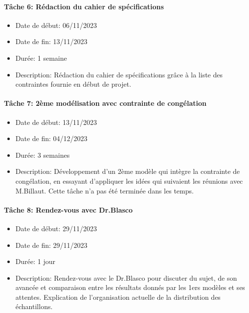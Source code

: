 \documentclass{polytech/polytech}
\numberwithin{figure}{chapter}
\begin{document}
\begin{appendix}
\paragraph{Tâche 6: Rédaction du cahier de spécifications}

\begin{itemize}
    \item Date de début: 06/11/2023
    \item Date de fin: 13/11/2023
    \item Durée: 1 semaine
    \item
        Description: Rédaction du cahier de spécifications grâce à la liste des contraintes fournie en début de projet.
\end{itemize}

\paragraph{Tâche 7: 2ème modélisation avec contrainte de congélation}

\begin{itemize}
    \item Date de début: 13/11/2023
    \item Date de fin: 04/12/2023
    \item Durée: 3 semaines
    \item
        Description: Développement d'un 2ème modèle qui intègre la contrainte de congélation, en essayant d'appliquer les idées qui suivaient les réunions avec M.Billaut. Cette tâche n'a pas été terminée dans les temps.
\end{itemize}

\paragraph{Tâche 8: Rendez-vous avec Dr.Blasco}

\begin{itemize}
    \item Date de début: 29/11/2023
    \item Date de fin: 29/11/2023
    \item Durée: 1 jour
    \item
        Description: Rendez-vous avec le Dr.Blasco pour discuter du sujet, de son avancée et comparaison entre les résultats donnés par les 1ers modèles et ses attentes. Explication de l'organisation actuelle de la distribution des échantillons.  
\end{itemize}


\end{appendix}
\end{document}
